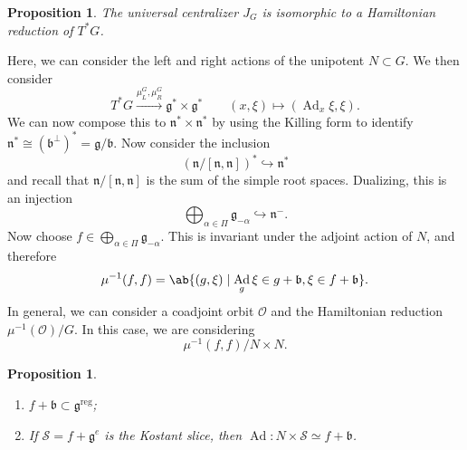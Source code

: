 \documentclass{amsart}
\newtheorem{prop}[thm]{Proposition}
\theoremstyle{definition}
\theoremstyle{remark}
\theoremstyle{plain}
\theoremstyle{definition}
\theoremstyle{remark}
\newcommand{\g}{\mathfrak{g}}
\newcommand{\n}{\mathfrak{n}}
\renewcommand{\b}{\mathfrak{b}}
\newcommand{\mc}[1]{\mathcal{#1}}
\newcommand{\on}[1]{\operatorname{#1}}
\newcommand{\1}{\mathbf{1}}
\newcommand{\2}{\mathbf{2}}
\newcommand{\3}{\mathbf{3}}
\DeclareMathOperator{\Ad}{Ad}
\begin{document}
\begin{prop}
    The universal centralizer \(J_G\) is isomorphic to a Hamiltonian reduction of \(T^* G\).
\end{prop}

Here, we can consider the left and right actions of the unipotent \(N \subset G\). We then consider
\[ T^* G \xrightarrow{\mu_L^G, \mu_R^G} \g^* \times \g^* \qquad (x, \xi) \mapsto (\Ad_x \xi, \xi). \]
We can now compose this to \(\n^* \times \n^*\) by using the Killing form to identify \(\n^* \cong (\b^{\perp})^* = \g/\b\). Now consider the inclusion
\[ (\n/[\n,\n])^* \hookrightarrow \n^* \]
and recall that \(\n/[\n, \n]\) is the sum of the simple root spaces. Dualizing, this is an injection
\[ \bigoplus_{\alpha \in \Pi} \g_{-\alpha} \hookrightarrow \n^-. \]
Now choose \(f \in \bigoplus_{\alpha \in \Pi} \g_{-\alpha}\). This is invariant under the adjoint action of \(N\), and therefore
\[ \mu^{-1}(f, f) = \ab\{ (g, \xi) \mid \Ad_g \xi \in g + \b, \xi \in f + \b\}. \]
In general, we can consider a coadjoint orbit \(\mc{O}\) and the Hamiltonian reduction \(\mu^{-1}(\mc{O}) / G\). In this case, we are considering
\[ \mu^{-1}(f, f) / N \times N. \]

\begin{prop}\leavevmode
    \begin{enumerate}
        \item \(f + \b \subset \g^{\on{reg}}\);
        \item If \(\mc{S} = f + \g^e\) is the Kostant slice, then \(\Ad \colon N \times \mc{S} \simeq f + \b\). 
    \end{enumerate}
\end{prop}
\end{document}
